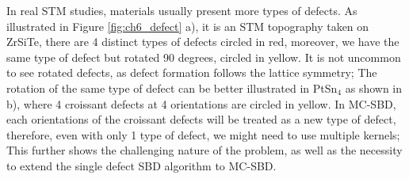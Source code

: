 In real STM studies, materials usually present more types of defects. As illustrated in Figure \ref{fig:ch6_defect} a), it is an STM topography taken on ZrSiTe, there are 4 distinct types of defects circled in red, moreover, we have the same type of defect but rotated 90 degrees, circled in yellow. It is not uncommon to see rotated defects, as defect formation follows the lattice symmetry; The rotation of the same type of defect can be better illustrated in PtSn$_4$ as shown in b), where 4 croissant defects at 4 orientations are circled in yellow. In \ac{MC-SBD}, each orientations of the croissant defects will be treated as a new type of defect, therefore, even with only 1 type of defect, we might need to use multiple kernels; This further shows the challenging nature of the problem, as well as the necessity to extend the single defect \ac{SBD} algorithm to \ac{MC-SBD}.
